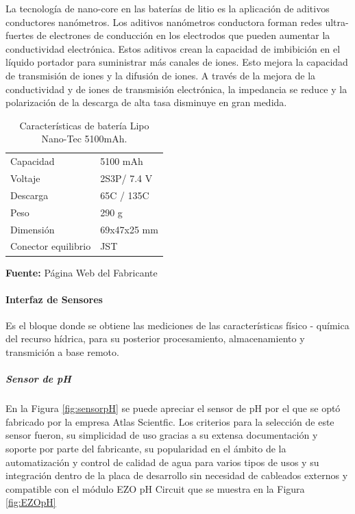 La tecnolog\'ia de nano-core en las bater\'ias de litio es la aplicaci\'on de aditivos conductores nan\'ometros. Los aditivos nan\'ometros conductora forman redes ultra-fuertes de electrones de conducci\'on en los electrodos que pueden aumentar la conductividad electr\'onica.
Estos aditivos crean la capacidad de imbibici\'on en el l\'iquido portador para suministrar m\'as canales de iones. Esto mejora la capacidad de transmisi\'on de iones y la difusi\'on de iones. A trav\'es de la mejora de la conductividad y de iones de transmisi\'on electr\'onica, la impedancia se reduce y la polarizaci\'on de la descarga de alta tasa disminuye en gran medida.
\begin{table}[t]
\protect\caption[Caracter\'isticas de bater\'ia Lipo Nano-Tech ]{Caracter\'isticas de bater\'ia Lipo Nano-Tec 5100mAh.}
\label{tab:caract_bat}
\begin{center}
\begin{tabular}{l l}
\hline
Capacidad    &  5100 mAh \\
Voltaje      &  2S3P/ 7.4 V \\
Descarga &  65C / 135C \\
Peso  & 290 g\\
Dimensi\'on   &  69x47x25 mm\\
Conector equilibrio	& JST\\
\hline
\end{tabular}
\vspace{5mm}
\newline
\hfill \textbf{Fuente:} P\'agina Web del Fabricante\cite{bateria}
\end{center}
\end{table}
\paragraph[Interfaz de Sensores]{Interfaz de Sensores}
Es el bloque donde se obtiene las mediciones de las caracter\'isticas f\'isico - qu\'imica del recurso h\'idrica, para su posterior procesamiento, almacenamiento y transmici\'on a base remoto.
\subparagraph{Sensor de pH}
En la Figura \ref{fig:sensorpH} se puede apreciar el sensor de pH por el que se optó fabricado por la empresa Atlas Scientfic.
Los criterios para la selección de este sensor fueron, su simplicidad de uso gracias a su extensa documentación y soporte por parte del fabricante, su popularidad en el ámbito de la automatización y control de calidad de agua para varios tipos de usos y su integración dentro de la placa de desarrollo sin necesidad de cableados externos y compatible con el módulo EZO pH Circuit que se muestra en la Figura \ref{fig:EZOpH}

